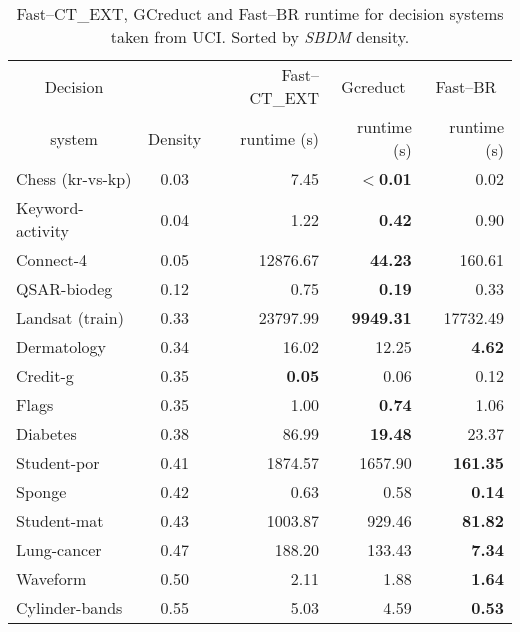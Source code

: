 \documentclass[letterpaper, twoside, openright, 12pt]{book}%
\begin{document}
	\begin{table}[H]
		\centering \footnotesize
		\caption{Fast--CT\_EXT, GCreduct and Fast--BR runtime for decision systems taken from UCI. Sorted by \textit{SBDM} density.}
		\label{tab:density}
		\begin{tabular}{lcrrr}
			\hline
			\multicolumn{1}{c}{Decision}  && Fast--CT\_EXT & \multicolumn{1}{c}{Gcreduct} & \multicolumn{1}{c}{Fast--BR}  \\
			\multicolumn{1}{c}{system}       & Density & runtime (s) & runtime (s)  & runtime (s)  \\
			\hline
			Chess (kr-vs-kp)          & 0.03    & 7.45          & \textbf{$<$0.01} & 0.02            \\
			Keyword-activity          & 0.04    & 1.22          & \textbf{0.42}    & 0.90            \\
			Connect-4                 & 0.05    & 12876.67      & \textbf{44.23}   & 160.61          \\
			QSAR-biodeg               & 0.12    & 0.75          & \textbf{0.19}    & 0.33            \\
			Landsat (train)           & 0.33    & 23797.99      & \textbf{9949.31} & 17732.49        \\
			Dermatology               & 0.34    & 16.02         & 12.25            & \textbf{4.62}   \\
			Credit-g                  & 0.35    & \textbf{0.05} & 0.06             & 0.12            \\
			Flags                     & 0.35    & 1.00          & \textbf{0.74}    & 1.06            \\
			Diabetes                  & 0.38    & 86.99         & \textbf{19.48}   & 23.37           \\
			Student-por               & 0.41    & 1874.57       & 1657.90          & \textbf{161.35} \\
			Sponge                    & 0.42    & 0.63          & 0.58             & \textbf{0.14}   \\
			Student-mat               & 0.43    & 1003.87       & 929.46           & \textbf{81.82}  \\
			Lung-cancer               & 0.47    & 188.20        & 133.43           & \textbf{7.34}   \\
			Waveform                  & 0.50    & 2.11          & 1.88             & \textbf{1.64}   \\
			Cylinder-bands            & 0.55    & 5.03          & 4.59             & \textbf{0.53}   \\
			\hline
		\end{tabular}
	\end{table}
\end{document}
